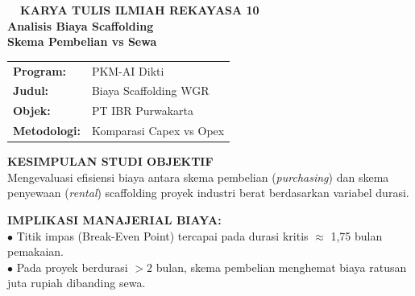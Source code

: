 \documentclass[10pt,a4paper,landscape]{article}
\begin{document}
\noindent
\begin{minipage}[t]{0.30\linewidth}
  \vspace{0pt}
  \begin{tcolorbox}[sharp corners, boxrule=0.8pt, colframe=pborder, colback=white, left=3mm, right=3mm, top=2.5mm, bottom=2.5mm, height=100mm]
    \colorbox{pred}{\fontsize{7pt}{8pt}\selectfont\bfseries\color{white}\ \ KARYA TULIS ILMIAH REKAYASA 10\ \ }\\[1.5mm]
    {\fontsize{9.5pt}{11.5pt}\selectfont\bfseries\color{pnavy}Analisis Biaya Scaffolding}\\[0.5mm]
    {\fontsize{7pt}{8.5pt}\selectfont\bfseries\color{pred}Skema Pembelian vs Sewa}\\[2mm]

    \begin{tcolorbox}[sharp corners, boxrule=0.5pt, colframe=pborder, colback=pbglight, left=2mm, right=2mm, top=1.5mm, bottom=1.5mm]
      \begin{tabularx}{\linewidth}{@{}p{22mm} X@{}}
        {\fontsize{6.8pt}{8pt}\selectfont\bfseries Program:} & {\fontsize{6.8pt}{8pt}\selectfont PKM-AI Dikti} \\[0.8mm]
        {\fontsize{6.8pt}{8pt}\selectfont\bfseries Judul:} & {\fontsize{6.8pt}{8pt}\selectfont Biaya Scaffolding WGR} \\[0.8mm]
        {\fontsize{6.8pt}{8pt}\selectfont\bfseries Objek:} & {\fontsize{6.8pt}{8pt}\selectfont PT IBR Purwakarta} \\[0.8mm]
        {\fontsize{6.8pt}{8pt}\selectfont\bfseries Metodologi:} & {\fontsize{6.8pt}{8pt}\selectfont Komparasi Capex vs Opex}
      \end{tabularx}
    \end{tcolorbox}
    \vspace{1.5mm}

    {\fontsize{7.5pt}{9pt}\selectfont\bfseries\color{pnavy}KESIMPULAN STUDI OBJEKTIF}\\[0.8mm]
    {\fontsize{6.5pt}{8.2pt}\selectfont\color{psteel}
    Mengevaluasi efisiensi biaya antara skema pembelian (\textit{purchasing}) dan skema penyewaan (\textit{rental}) scaffolding proyek industri berat berdasarkan variabel durasi.
    }
  \end{tcolorbox}
  \vspace{2mm}

  \begin{tcolorbox}[sharp corners, boxrule=0.6pt, colframe=pnavy, colback=pbglight, left=2.5mm, right=2.5mm, top=2mm, bottom=2mm, height=52mm]
    {\fontsize{7pt}{8.5pt}\selectfont\bfseries\color{pnavy}IMPLIKASI MANAJERIAL BIAYA:}\\[1.5mm]
    {\fontsize{6.5pt}{8.2pt}\selectfont\color{psteel}
    $\bullet$ Titik impas (Break-Even Point) tercapai pada durasi kritis $\approx$ 1,75 bulan pemakaian.\\
    $\bullet$ Pada proyek berdurasi $> 2$ bulan, skema pembelian menghemat biaya ratusan juta rupiah dibanding sewa.
    }
  \end{tcolorbox}
\end{minipage}%
\end{document}
